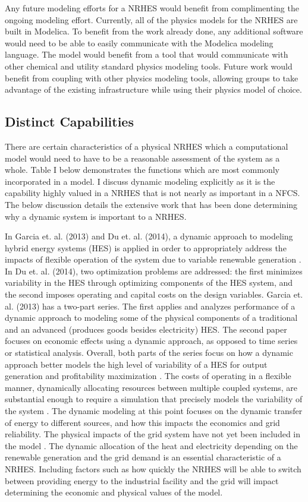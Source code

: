 \documentclass[12pt]{UIdahoMastersThesis}
\begin{document}
Any future modeling efforts for a NRHES would benefit from complimenting the ongoing modeling effort. Currently, all of the physics models for the NRHES are built in Modelica. To benefit from the work already done, any additional software would need to be able to easily communicate with the Modelica modeling language.  The model would benefit from a tool that would communicate with other chemical and utility standard physics modeling tools. Future work would benefit from coupling with other physics modeling tools, allowing groups to take advantage of the existing infrastructure while using their physics model of choice.

\subsection{Distinct Capabilities}
There are certain characteristics of a physical NRHES which a computational model would need to have to be a reasonable assessment of the system as a whole. Table I below demonstrates the functions which are most commonly incorporated in a model. I discuss dynamic modeling explicitly as it is the capability highly valued in a NRHES that is not nearly as important in a NFCS. The below discussion details the extensive work that has been done determining why a dynamic system is important to a NRHES.

In Garcia et. al. (2013) and Du et. al. (2014), a dynamic approach to modeling hybrid energy systems (HES) is applied in order to appropriately address the impacts of flexible operation of the system due to variable renewable generation \cite{Garcia2013, Du2014}. In Du et. al. (2014), two optimization problems are addressed: the first minimizes variability in the HES through optimizing components of the HES system, and the second imposes operating and capital costs on the design variables. Garcia et. al. (2013) has a two-part series. The first applies and analyzes performance of a dynamic approach to modeling some of the physical components of a traditional and an advanced (produces goods besides electricity) HES. The second paper focuses on economic effects using a dynamic approach, as opposed to time series or statistical analysis. Overall, both parts of the series focus on how a dynamic approach better models the high level of variability of a HES for output generation and profitability maximization \cite{Garcia2013}. The costs of operating in a flexible manner, dynamically allocating resources between multiple coupled systems, are substantial enough to require a simulation that precisely models the variability of the system \cite{Garcia2013, Shropshire2011, Locatelli2015}. The dynamic modeling at this point focuses on the dynamic transfer of energy to different sources, and how this impacts the economics and grid reliability. The physical impacts of the grid system have not yet been included in the model \cite{Harrison2016}.  The dynamic allocation of the heat and electricity depending on the renewable generation and the grid demand is an essential characteristic of a NRHES.  Including factors such as how quickly the NRHES will be able to switch between providing energy to the industrial facility and the grid will impact determining the economic and physical values of the model.
\end{document}
